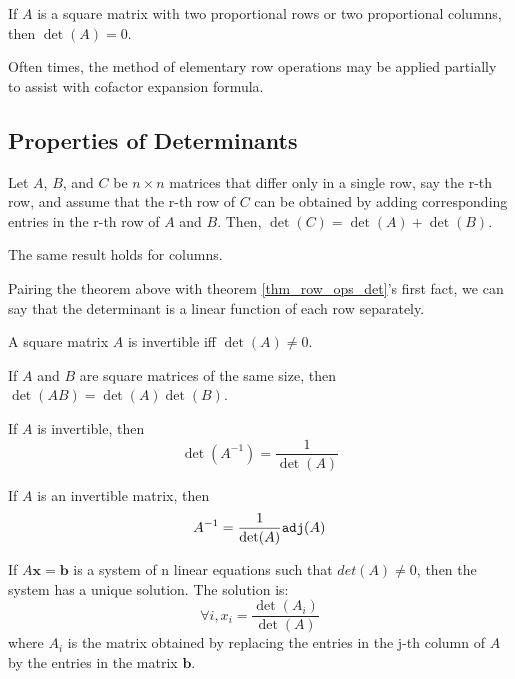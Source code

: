 \documentclass{report}
\begin{document}
				\begin{thm}
					If $A$ is a square matrix with two proportional rows or two proportional columns, then $\det(A)=0$.
				\end{thm}
				
				Often times, the method of elementary row operations may be applied partially to assist with cofactor expansion formula.
			
		\subsection{Properties of Determinants}
			\begin{thm}
				Let $A$, $B$, and $C$ be $n \times n$ matrices that differ only in a single row, say the r-th row, and assume that the r-th row of $C$ can be obtained by adding corresponding entries in the r-th row of $A$ and $B$. Then, $\det(C)=\det(A)+\det(B)$.
				
				The same result holds for columns.
			\end{thm}
			
			Pairing the theorem above with theorem \ref{thm_row_ops_det}'s first fact, we can say that the determinant is a linear function of each row separately.
			
			\begin{thm}
				A square matrix $A$ is invertible iff $\det(A) \ne 0$.
			\end{thm}
			
			\begin{thm}
				If $A$ and $B$ are square matrices of the same size, then $\det(AB)=\det(A)\det(B)$.
			\end{thm}
			
			\begin{thm}
				If $A$ is invertible, then
				\begin{displaymath}
					\det(A^{-1})=\frac{1}{\det(A)}
				\end{displaymath}
			\end{thm}
			
			\begin{thm}
				If $A$ is an invertible matrix, then
				\begin{displaymath}
					A^{-1}=\frac{1}{\det(A)}\verb|adj|(A)
				\end{displaymath}
			\end{thm}
			
			\begin{thm}
				If $A\bm{x}=\bm{b}$ is a system of n linear equations such that $det(A)\ne0$, then the system has a unique solution. The solution is:
				\begin{displaymath}
					\forall i, x_i=\frac{\det(A_i)}{\det(A)}
				\end{displaymath}
				where $A_i$ is the matrix obtained by replacing the entries in the j-th column of $A$ by the entries in the matrix $\bm{b}$.
			\end{thm}
		
\end{document}
